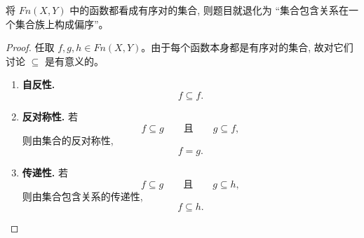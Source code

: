 \begin{remark}
	将 $Fn(X, Y)$ 中的函数都看成有序对的集合, 则题目就退化为 ``集合包含关系在一个集合族上构成偏序''。
\end{remark}

\begin{proof}
  任取 $f, g, h \in Fn(X, Y)$。由于每个函数本身都是有序对的集合, 故对它们讨论 $\subseteq$ 是有意义的。

  \begin{enumerate}[(1)]
    \item \textbf{自反性.}
      \[
        f \subseteq f.
      \]

    \item \textbf{反对称性.} 若
      \[
        f \subseteq g
        \qquad \text{且} \qquad
        g \subseteq f,
      \]
      则由集合的反对称性,
      \[
        f = g.
      \]

    \item \textbf{传递性.} 若
      \[
        f \subseteq g
        \qquad \text{且} \qquad
        g \subseteq h,
      \]
      则由集合包含关系的传递性,
      \[
        f \subseteq h.
      \]
  \end{enumerate}
\end{proof}